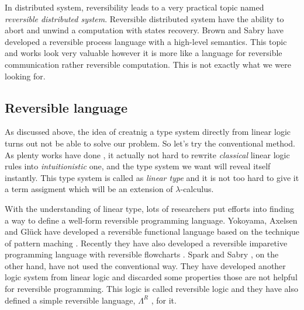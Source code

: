 \documentclass[a4paper,twocolumn]{article}
\begin{document}
In distributed system, reversibility leads to a very practical topic named {\textit{reversible distributed system}}. Reversible distributed system have the ability to abort and unwind a computation with states recovery. Brown and Sabry \cite{Brown16} have developed a reversible process language with a high-level semantics. This topic and works look very valuable however it is more like a language for reversible communication rather reversible computation. This is not exactly what we were looking for.

\subsection*{Reversible language}

As discussed above, the idea of creatnig a type system directly from linear logic turns out not be able to solve our problem. So let's try the conventional method. As plenty works have done \cite{Benton92, Wadler93, Benton93, Ronchi94, Turner98}, it actually not hard to rewrite \textit{classical} linear logic rules into \textit{intuitionistic} one, and the type system we want will reveal itself instantly. This type system is called as \textit{linear type} and it is not too hard to give it a term assigment which will be an extension of $\lambda$-calculus.

With the understanding of linear type, lots of researchers put efforts into finding a way to define a well-form reversible programming language. Yokoyama, Axelsen and Gl\"{u}ck have developed a reversible functional language based on the technique of pattern maching \cite{Yokoyama11}. Recently they have also developed a reversible imparetive programming language with reversible flowcharts \cite{Yokoyama16}. Spark and Sabry \cite{Sparks14}, on the other hand, have not used the conventional way. They have developed another logic system from linear logic and discarded some properties those are not helpful for reversible programming. This logic is called reversible logic and they have also defined a simple reversible language, $\Lambda^{R}$ , for it.

\end{document}
